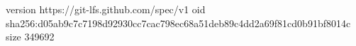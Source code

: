 version https://git-lfs.github.com/spec/v1
oid sha256:d05ab9c7c7198d92930cc7cac798ec68a51deb89c4dd2a69f81cd0b91bf8014c
size 349692
